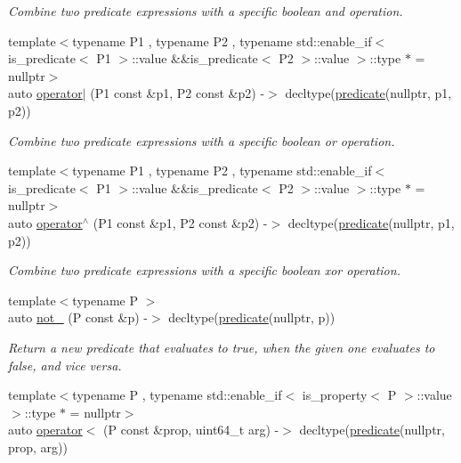 \begin{DoxyCompactItemize}
\begin{DoxyCompactList}\small\item\em Combine two predicate expressions with a specific boolean \textquotesingle{}and\textquotesingle{} operation. \end{DoxyCompactList}\item 
{\footnotesize template$<$typename P1 , typename P2 , typename std\+::enable\+\_\+if$<$ is\+\_\+predicate$<$ P1 $>$\+::value \&\&is\+\_\+predicate$<$ P2 $>$\+::value $>$\+::type $\ast$  = nullptr$>$ }\\auto \hyperlink{namespacepfq_1_1lang_a425bb535884185450da7addcdb47f35b}{operator$\vert$} (P1 const \&p1, P2 const \&p2) -\/$>$ decltype(\hyperlink{namespacepfq_1_1lang_aca9adafc436b7f851621b979fa1aaf88}{predicate}(nullptr, p1, p2))
\begin{DoxyCompactList}\small\item\em Combine two predicate expressions with a specific boolean \textquotesingle{}or\textquotesingle{} operation. \end{DoxyCompactList}\item 
{\footnotesize template$<$typename P1 , typename P2 , typename std\+::enable\+\_\+if$<$ is\+\_\+predicate$<$ P1 $>$\+::value \&\&is\+\_\+predicate$<$ P2 $>$\+::value $>$\+::type $\ast$  = nullptr$>$ }\\auto \hyperlink{namespacepfq_1_1lang_aa6692a978788617acebfee6ded6ebbbc}{operator$^\wedge$} (P1 const \&p1, P2 const \&p2) -\/$>$ decltype(\hyperlink{namespacepfq_1_1lang_aca9adafc436b7f851621b979fa1aaf88}{predicate}(nullptr, p1, p2))
\begin{DoxyCompactList}\small\item\em Combine two predicate expressions with a specific boolean \textquotesingle{}xor\textquotesingle{} operation. \end{DoxyCompactList}\item 
{\footnotesize template$<$typename P $>$ }\\auto \hyperlink{namespacepfq_1_1lang_aad91ae49c0ddea5a9219f679e8de212a}{not\+\_\+} (P const \&p) -\/$>$ decltype(\hyperlink{namespacepfq_1_1lang_aca9adafc436b7f851621b979fa1aaf88}{predicate}(nullptr, p))
\begin{DoxyCompactList}\small\item\em Return a new predicate that evaluates to true, when the given one evaluates to false, and vice versa. \end{DoxyCompactList}\item 
{\footnotesize template$<$typename P , typename std\+::enable\+\_\+if$<$ is\+\_\+property$<$ P $>$\+::value $>$\+::type $\ast$  = nullptr$>$ }\\auto \hyperlink{namespacepfq_1_1lang_aa358821bfd1326e552c69635b969835d}{operator$<$} (P const \&prop, uint64\+\_\+t arg) -\/$>$ decltype(\hyperlink{namespacepfq_1_1lang_aca9adafc436b7f851621b979fa1aaf88}{predicate}(nullptr, prop, arg))

\end{DoxyCompactItemize}
